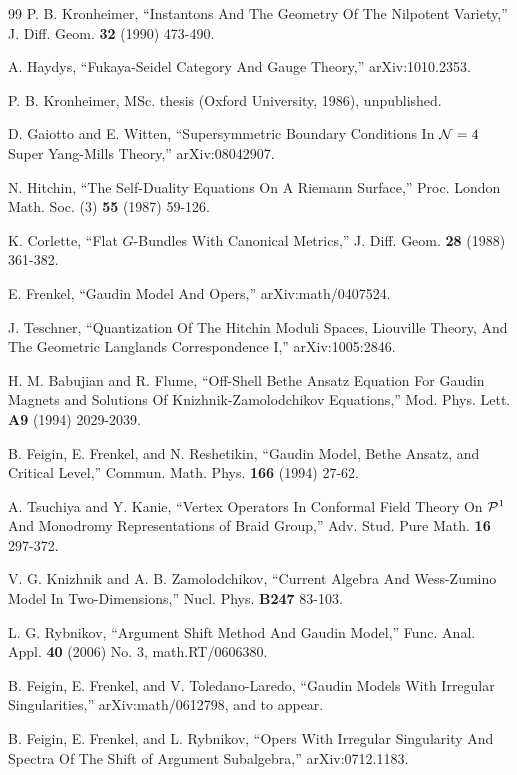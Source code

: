 \begin{thebibliography}{99}
P. B. Kronheimer, ``Instantons And The Geometry Of The Nilpotent Variety,''
J. Diff. Geom. {\bf 32} (1990) 473-490.


A. Haydys, ``Fukaya-Seidel Category And Gauge Theory,''
arXiv:1010.2353.


P. B. Kronheimer, MSc. thesis (Oxford University, 1986), unpublished.

D. Gaiotto and E. Witten, ``Supersymmetric Boundary Conditions In $\N=4$ Super
Yang-Mills Theory,'' arXiv:08042907.

N. Hitchin, ``The Self-Duality Equations On A Riemann Surface,'' Proc. London Math. Soc.
(3) {\bf 55} (1987) 59-126.

K. Corlette,  ``Flat $G$-Bundles With Canonical Metrics,'' J. Diff. Geom. {\bf 28} (1988)
361-382.

E. Frenkel, ``Gaudin Model And Opers,'' arXiv:math/0407524.

J. Teschner, ``Quantization Of The Hitchin Moduli Spaces, Liouville Theory,
And The Geometric Langlands Correspondence I,'' arXiv:1005:2846.

H. M. Babujian and R. Flume, ``Off-Shell Bethe Ansatz Equation
For Gaudin Magnets and Solutions Of Knizhnik-Zamolodchikov Equations,''
Mod. Phys. Lett. {\bf A9} (1994) 2029-2039.

B. Feigin, E. Frenkel, and N. Reshetikin, ``Gaudin Model, Bethe Ansatz, and
Critical Level,'' Commun. Math. Phys. {\bf 166} (1994) 27-62.


A. Tsuchiya and Y. Kanie, ``Vertex Operators In Conformal Field Theory On
$\P^1$ And Monodromy Representations of Braid Group,'' Adv. Stud. Pure
Math. {\bf 16} 297-372.

V. G. Knizhnik and A. B. Zamolodchikov, ``Current Algebra And
Wess-Zumino Model In Two-Dimensions,'' Nucl. Phys. {\bf B247} 83-103.

L. G. Rybnikov, ``Argument Shift Method And Gaudin Model,'' Func. Anal. Appl. {\bf 40}
(2006) No. 3, math.RT/0606380.

B. Feigin, E. Frenkel, and V. Toledano-Laredo,
``Gaudin Models With Irregular Singularities,'' arXiv:math/0612798,
and to appear.

B. Feigin, E. Frenkel, and L. Rybnikov, ``Opers With Irregular Singularity And Spectra Of The Shift of Argument
Subalgebra,'' arXiv:0712.1183.



\end{thebibliography}
